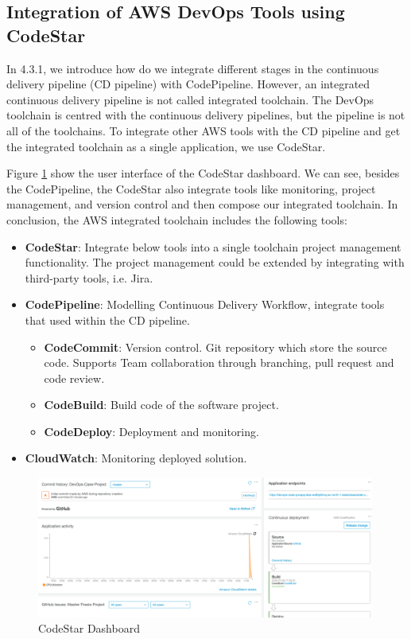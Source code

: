 \subsection{Integration of AWS DevOps Tools using CodeStar}
In 4.3.1, we introduce how do we integrate different stages in the continuous delivery pipeline (CD pipeline) with CodePipeline. However, an integrated continuous delivery pipeline is not called integrated toolchain. The DevOps toolchain is centred with the continuous delivery pipelines, but the pipeline is not all of the toolchains. To integrate other AWS tools with the CD pipeline and get the integrated toolchain as a single application, we use CodeStar.  
\par
Figure \ref{fig:codestar} show the user interface of the CodeStar dashboard. We can see, besides the CodePipeline, the CodeStar also integrate tools like monitoring, project management, and version control and then compose our integrated toolchain. In conclusion, the AWS integrated toolchain includes the following tools:\label{codestar}
\begin{itemize}
     \item \textbf{CodeStar}: Integrate below tools into a single toolchain project management functionality. The project management could be extended by integrating with third-party tools, i.e. Jira.
          \item \textbf{CodePipeline}: Modelling Continuous Delivery Workflow, integrate tools that used within the CD pipeline.
          \begin{itemize}
               \item \textbf{CodeCommit}: Version control. Git repository which store the source code. Supports Team collaboration through branching, pull request and code review.
               \item \textbf{CodeBuild}: Build code of the software project.
               \item \textbf{CodeDeploy}: Deployment and monitoring. 
          \end{itemize}
          \item \textbf{CloudWatch}: Monitoring deployed solution.
\end{itemize}
\begin{figure}[h]
     \centering
     \includegraphics[width=0.99\textwidth]{pics/codestar.png}
     \caption{CodeStar Dashboard}
     \label{fig:codestar}
    \end{figure}

